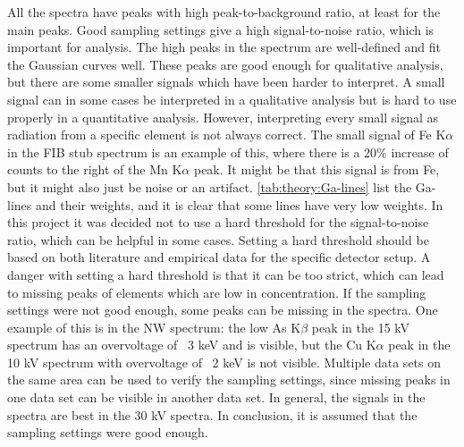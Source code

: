 All the spectra have peaks with high peak-to-background ratio, at least for the main peaks. %
Good sampling settings give a high signal-to-noise ratio, which is important for analysis.
The high peaks in the spectrum are well-defined and fit the Gaussian curves well.
These peaks are good enough for qualitative analysis, but there are some smaller signals which have been harder to interpret.
A small signal can in some cases be interpreted in a qualitative analysis but is hard to use properly in a quantitative analysis.
However, interpreting every small signal as radiation from a specific element is not always correct.
The small signal of Fe K$\alpha$ in the FIB stub spectrum is an example of this, where there is a 20\% increase of counts to the right of the Mn K$\alpha$ peak.
It might be that this signal is from Fe, but it might also just be noise or an artifact.
\cref{tab:theory:Ga-lines} list the Ga-lines and their weights, and it is clear that some lines have very low weights.
In this project it was decided not to use a hard threshold for the signal-to-noise ratio, which can be helpful in some cases.
Setting a hard threshold should be based on both literature and empirical data for the specific detector setup.
A danger with setting a hard threshold is that it can be too strict, which can lead to missing peaks of elements which are low in concentration.
If the sampling settings were not good enough, some peaks can be missing in the spectra.
One example of this is in the NW spectrum: the low As K$\beta$ peak in the 15 kV spectrum has an overvoltage of ~3 keV and is visible, but the Cu K$\alpha$ peak in the 10 kV spectrum with overvoltage of ~2 keV is not visible.
Multiple data sets on the same area can be used to verify the sampling settings, since missing peaks in one data set can be visible in another data set.
In general, the signals in the spectra are best in the 30 kV spectra.
In conclusion, it is assumed that the sampling settings were good enough.



